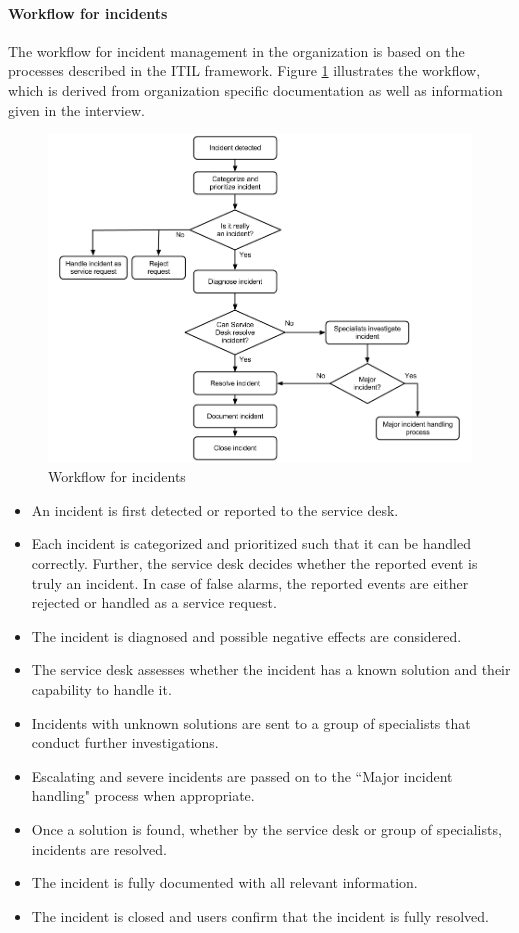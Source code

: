 \paragraph{Workflow for incidents}
The workflow for incident management in the organization is based on the processes described in the ITIL framework. Figure \ref{fig:workflowcaseC} illustrates the workflow, which is derived from organization specific documentation as well as information given in the interview. 

\begin{figure}[H]
\hspace{-1.1cm}\includegraphics[scale=0.49]{workflowcaseC.png}
\caption[Workflow for incidents, Case C]{Workflow for incidents}
\label{fig:workflowcaseC}
\end{figure}

\begin{itemize}
\item An incident is first detected or reported to the service desk.
\item Each incident is categorized and prioritized such that it can be handled correctly. Further, the service desk decides whether the reported event is truly an incident. In case of false alarms, the reported events are either rejected or handled as a service request.
\item The incident is diagnosed and possible negative effects are considered.
\item The service desk assesses whether the incident has a known solution and their capability to handle it.
\item Incidents with unknown solutions are sent to a group of specialists that conduct further investigations.
\item Escalating and severe incidents are passed on to the ``Major incident handling" process when appropriate. 
\item Once a solution is found, whether by the service desk or group of specialists, incidents are resolved.
\item The incident is fully documented with all relevant information.
\item The incident is closed and users confirm that the incident is fully resolved. 
\end{itemize}

